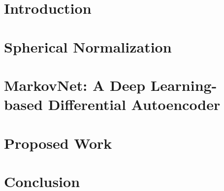 \documentclass[12pt]{article}
\title{}
\author{
	\authorName\\
	\authorDepartment\\
	\authorAddress \\ %
	\authorEmail \\
}
\date{\today}
\begin{document}
	


\newpage
\tableofcontents

\newpage

\section{Introduction}


\section{Spherical Normalization}
\label{chap:sph_norm}


\section{MarkovNet: A Deep Learning-based Differential Autoencoder}
\label{chap:markovnet}


\section{Proposed Work}
\label{chap:proposed}


\section{Conclusion}


\newpage
\small


\end{document}
